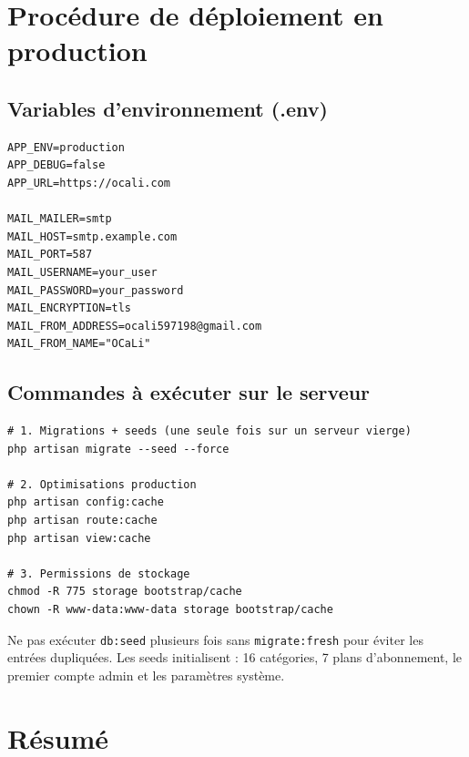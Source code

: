 \documentclass[12pt,a4paper]{article}
\newcommand{\warn}{\textcolor{OrangeOCaLi}{\ding{115}}}
\begin{document}
\section{Procédure de déploiement en production}

\subsection{Variables d'environnement (.env)}

\begin{infobox}
\begin{verbatim}
APP_ENV=production
APP_DEBUG=false
APP_URL=https://ocali.com

MAIL_MAILER=smtp
MAIL_HOST=smtp.example.com
MAIL_PORT=587
MAIL_USERNAME=your_user
MAIL_PASSWORD=your_password
MAIL_ENCRYPTION=tls
MAIL_FROM_ADDRESS=ocali597198@gmail.com
MAIL_FROM_NAME="OCaLi"
\end{verbatim}
\end{infobox}

\subsection{Commandes à exécuter sur le serveur}

\begin{infobox}
\begin{verbatim}
# 1. Migrations + seeds (une seule fois sur un serveur vierge)
php artisan migrate --seed --force

# 2. Optimisations production
php artisan config:cache
php artisan route:cache
php artisan view:cache

# 3. Permissions de stockage
chmod -R 775 storage bootstrap/cache
chown -R www-data:www-data storage bootstrap/cache
\end{verbatim}
\end{infobox}

\begin{alertbox}[{\warn\ Important}]
Ne pas exécuter \texttt{db:seed} plusieurs fois sans \texttt{migrate:fresh} pour éviter les entrées dupliquées.
Les seeds initialisent : 16 catégories, 7 plans d'abonnement, le premier compte admin et les paramètres système.
\end{alertbox}

\section{Résumé}
\end{document}
